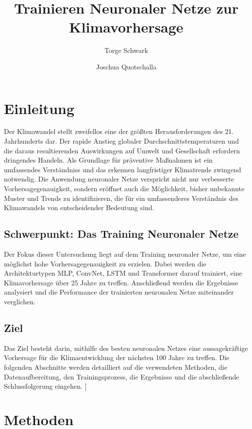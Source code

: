 \documentclass[acmtog, authorversion]{acmart} %
\begin{document}
\title{Trainieren Neuronaler Netze zur Klimavorhersage}

\author{Torge Schwark}
\author{Joschua Quotschalla}
\authornotemark[1]


\maketitle

\section{Einleitung}
Der Klimawandel stellt zweifellos eine der größten Herausforderungen des 21. Jahrhunderts dar. Der rapide Anstieg globaler Durchschnittstemperaturen und die daraus resultierenden Auswirkungen auf Umwelt und Gesellschaft erfordern dringendes Handeln. Als Grundlage für präventive Maßnahmen ist ein umfassendes Verständniss und das erkennen langfristiger Klimatrends zwingend notwendig. 
Die Anwendung neuronaler Netze verspricht nicht nur verbesserte Vorhersagegenauigkeit, sondern eröffnet auch die Möglichkeit, bisher unbekannte Muster und Trends zu identifizieren, die für ein umfassenderes Verständnis des Klimawandels von entscheidender Bedeutung sind.

\subsection{Schwerpunkt: Das Training Neuronaler Netze}
Der Fokus dieser Untersuchung liegt auf dem Training neuronaler Netze, um eine möglichst hohe Vorhersagegenauigkeit zu erzielen. Dabei werden die Architekturtypen MLP, ConvNet, LSTM und Transformer darauf trainiert, eine Klimavorhersage über 25 Jahre zu treffen. Anschließend werden die Ergebnisse analysiert und die Performance der trainierten neuronalen Netze miteinander verglichen. 

\subsection{Ziel}
Das Ziel besteht darin, mithilfe des besten neuronalen Netzes eine aussagekräftige Vorhersage für die Klimaentwicklung der nächsten 100 Jahre zu treffen.
Die folgenden Abschnitte werden detailliert auf die verwendeten Methoden, die Datenaufbereitung, den Trainingsprozess, die Ergebnisse und die abschließende Schlussfolgerung eingehen.
]


\section{Methoden}
\end{document}
